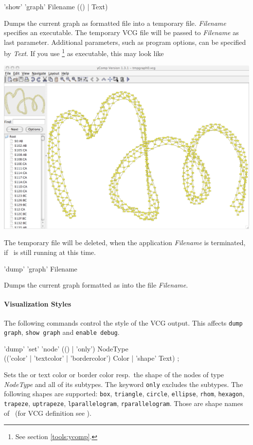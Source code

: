 \begin{rail}
  'show' 'graph' Filename (() | Text)
\end{rail}
Dumps the current graph as  formatted file into a temporary file. \emph{Filename} specifies an executable. The temporary VCG file will be passed to \emph{Filename} as last parameter. Additional parameters, such as program options, can be specified by \emph{Text}. If you use \yComp\footnote{See section \ref{tools:ycomp}.} as executable, this may look like
\begin{center}
  \includegraphics[width=0.75\linewidth]{fig/showgraph}
\end{center}  
The temporary file will be deleted, when the application \emph{Filename} is terminated, if \GrShell\ is still running at this time.

\begin{rail}
  'dump' 'graph' Filename
\end{rail}
Dumps the current graph formatted as  into the file \emph{Filename}.\\

\paragraph{Visualization Styles}
The following commands control the style of the VCG output. This affects \texttt{dump graph}, \texttt{show graph} and \texttt{enable debug}. 
\begin{rail}
  'dump' 'set' 'node' (() | 'only') NodeType \\ (('color' | 'textcolor' | 'bordercolor') Color | 'shape' Text) ;
\end{rail}
Sets the  or text color or border color resp.\ the shape of the nodes of type \emph{NodeType} and all of its subtypes. The keyword \texttt{only} excludes the subtypes. The following shapes are supported: \texttt{box}, \texttt{triangle}, \texttt{circle}, \texttt{ellipse}, \texttt{rhom}, \texttt{hexagon}, \texttt{trapeze}, \texttt{uptrapeze}, \texttt{lparallelogram}, \texttt{rparallelogram}. Those are shape names of \yComp\ (for VCG definition see \cite{vcg}).

